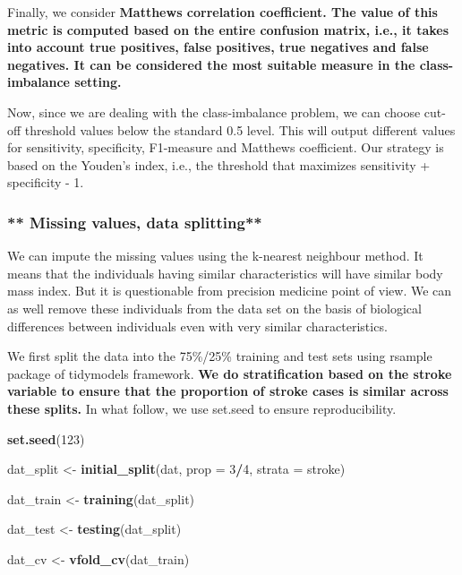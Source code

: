 \documentclass[
]{article}
\newenvironment{Shaded}{\begin{snugshade}}{\end{snugshade}}
\newcommand{\AttributeTok}[1]{\textcolor[rgb]{0.13,0.29,0.53}{#1}}
\newcommand{\DecValTok}[1]{\textcolor[rgb]{0.00,0.00,0.81}{#1}}
\newcommand{\FunctionTok}[1]{\textcolor[rgb]{0.13,0.29,0.53}{\textbf{#1}}}
\newcommand{\NormalTok}[1]{#1}
\newcommand{\OtherTok}[1]{\textcolor[rgb]{0.56,0.35,0.01}{#1}}
\newcommand{\SpecialCharTok}[1]{\textcolor[rgb]{0.81,0.36,0.00}{\textbf{#1}}}
\begin{document}
Finally, we consider \textbf{Matthews correlation coefficient. The value
of this metric is computed based on the entire confusion matrix, i.e.,
it takes into account true positives, false positives, true negatives
and false negatives. It can be considered the most suitable measure in
the class-imbalance setting.}

Now, since we are dealing with the class-imbalance problem, we can
choose cut-off threshold values below the standard 0.5 level. This will
output different values for sensitivity, specificity, F1-measure and
Matthews coefficient. Our strategy is based on the Youden's index, i.e.,
the threshold that maximizes sensitivity + specificity - 1.

\subsubsection{** Missing values, data
splitting**}\label{missing-values-data-splitting}

We can impute the missing values using the k-nearest neighbour method.
It means that the individuals having similar characteristics will have
similar body mass index. But it is questionable from precision medicine
point of view. We can as well remove these individuals from the data set
on the basis of biological differences between individuals even with
very similar characteristics.

We first split the data into the 75\%/25\% training and test sets using
rsample package of tidymodels framework. \textbf{We do stratification
based on the stroke variable to ensure that the proportion of stroke
cases is similar across these splits.} In what follow, we use set.seed
to ensure reproducibility.

\begin{Shaded}
\begin{Highlighting}[]
\FunctionTok{set.seed}\NormalTok{(}\DecValTok{123}\NormalTok{)}

\NormalTok{dat\_split }\OtherTok{\textless{}{-}} \FunctionTok{initial\_split}\NormalTok{(dat, }\AttributeTok{prop =} \DecValTok{3}\SpecialCharTok{/}\DecValTok{4}\NormalTok{, }\AttributeTok{strata =}\NormalTok{ stroke)}

\NormalTok{dat\_train }\OtherTok{\textless{}{-}} \FunctionTok{training}\NormalTok{(dat\_split)}

\NormalTok{dat\_test }\OtherTok{\textless{}{-}} \FunctionTok{testing}\NormalTok{(dat\_split)}
                      
\NormalTok{dat\_cv }\OtherTok{\textless{}{-}} \FunctionTok{vfold\_cv}\NormalTok{(dat\_train)}
\end{Highlighting}
\end{Shaded}
\end{document}
